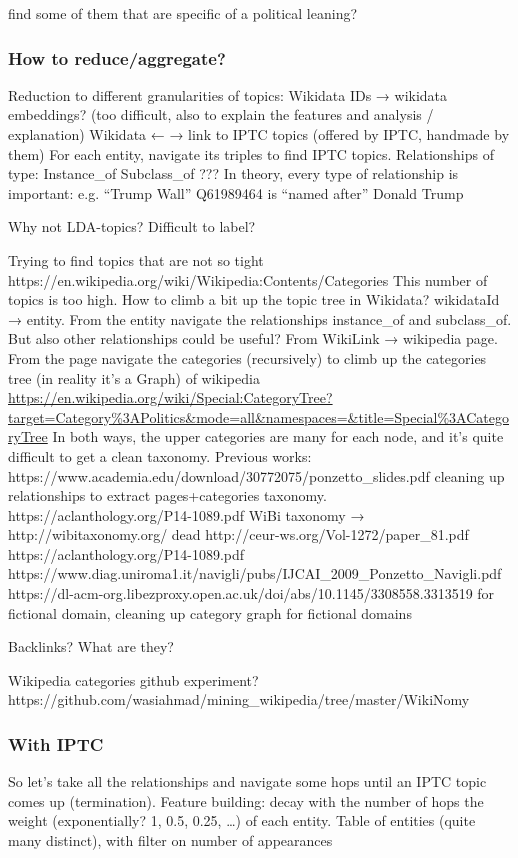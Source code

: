 find some of them that are specific of a political leaning? 

\subsubsection{How to reduce/aggregate?}

Reduction to different granularities of topics:
Wikidata IDs → wikidata embeddings? (too difficult, also to explain the features and analysis / explanation)
Wikidata ← → link to IPTC topics (offered by IPTC, handmade by them)
For each entity, navigate its triples to find IPTC topics. Relationships of type:
Instance\_of
Subclass\_of
???
In theory, every type of relationship is important: e.g. “Trump Wall” Q61989464 is “named after” Donald Trump 

Why not LDA-topics?
Difficult to label?

Trying to find topics that are not so tight
https://en.wikipedia.org/wiki/Wikipedia:Contents/Categories 
This number of topics is too high. How to climb a bit up the topic tree in Wikidata?
wikidataId → entity. From the entity navigate the relationships instance\_of and subclass\_of. But also other relationships could be useful?
From WikiLink → wikipedia page. From the page navigate the categories (recursively) to climb up the categories tree (in reality it’s a Graph) of wikipedia \url{https://en.wikipedia.org/wiki/Special:CategoryTree?target=Category\%3APolitics&mode=all&namespaces=&title=Special%3ACategoryTree}
In both ways, the upper categories are many for each node, and it’s quite difficult to get a clean taxonomy.
Previous works:
https://www.academia.edu/download/30772075/ponzetto\_slides.pdf cleaning up relationships to extract pages+categories taxonomy.
https://aclanthology.org/P14-1089.pdf WiBi taxonomy → http://wibitaxonomy.org/ dead http://ceur-ws.org/Vol-1272/paper\_81.pdf https://aclanthology.org/P14-1089.pdf https://www.diag.uniroma1.it/navigli/pubs/IJCAI\_2009\_Ponzetto\_Navigli.pdf 
https://dl-acm-org.libezproxy.open.ac.uk/doi/abs/10.1145/3308558.3313519 for fictional domain, cleaning up category graph for fictional domains

Backlinks? What are they?

Wikipedia categories github experiment? https://github.com/wasiahmad/mining\_wikipedia/tree/master/WikiNomy 



\subsubsection{With IPTC}
So let’s take all the relationships and navigate some hops until an IPTC topic comes up (termination).
Feature building: decay with the number of hops the weight (exponentially? 1, 0.5, 0.25, …) of each entity.
Table of entities (quite many distinct), with filter on number of appearances

